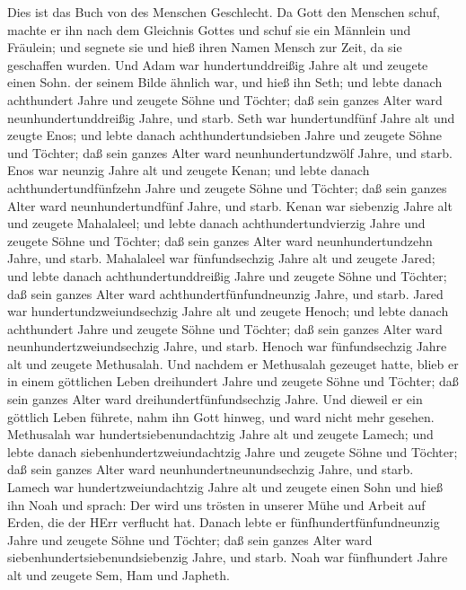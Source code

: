  Dies ist das Buch von des Menschen Geschlecht. Da Gott den
Menschen schuf, machte er ihn nach dem Gleichnis Gottes  und
schuf sie ein Männlein und Fräulein; und segnete sie und hieß ihren
Namen Mensch zur Zeit, da sie geschaffen wurden.  Und Adam
war hundertunddreißig Jahre alt und zeugete einen Sohn. der seinem Bilde
ähnlich war, und hieß ihn Seth;  und lebte danach
achthundert Jahre und zeugete Söhne und Töchter;  daß sein
ganzes Alter ward neunhundertunddreißig Jahre, und starb. 
Seth war hundertundfünf Jahre alt und zeugte Enos;  und
lebte danach achthundertundsieben Jahre und zeugete Söhne und Töchter;
 daß sein ganzes Alter ward neunhundertundzwölf Jahre, und
starb.  Enos war neunzig Jahre alt und zeugete Kenan;
 und lebte danach achthundertundfünfzehn Jahre und zeugete
Söhne und Töchter;  daß sein ganzes Alter ward
neunhundertundfünf Jahre, und starb.  Kenan war siebenzig
Jahre alt und zeugete Mahalaleel;  und lebte danach
achthundertundvierzig Jahre und zeugete Söhne und Töchter; 
daß sein ganzes Alter ward neunhundertundzehn Jahre, und starb.
 Mahalaleel war fünfundsechzig Jahre alt und zeugete Jared;
 und lebte danach achthundertunddreißig Jahre und zeugete
Söhne und Töchter;  daß sein ganzes Alter ward
achthundertfünfundneunzig Jahre, und starb.  Jared war
hundertundzweiundsechzig Jahre alt und zeugete Henoch;  und
lebte danach achthundert Jahre und zeugete Söhne und Töchter;
 daß sein ganzes Alter ward neunhundertzweiundsechzig
Jahre, und starb.  Henoch war fünfundsechzig Jahre alt und
zeugete Methusalah.  Und nachdem er Methusalah gezeuget
hatte, blieb er in einem göttlichen Leben dreihundert Jahre und zeugete
Söhne und Töchter;  daß sein ganzes Alter ward
dreihundertfünfundsechzig Jahre.  Und dieweil er ein
göttlich Leben führete, nahm ihn Gott hinweg, und ward nicht mehr
gesehen.  Methusalah war hundertsiebenundachtzig Jahre alt
und zeugete Lamech;  und lebte danach
siebenhundertzweiundachtzig Jahre und zeugete Söhne und Töchter;
 daß sein ganzes Alter ward neunhundertneunundsechzig
Jahre, und starb.  Lamech war hundertzweiundachtzig Jahre
alt und zeugete einen Sohn  und hieß ihn Noah und sprach:
Der wird uns trösten in unserer Mühe und Arbeit auf Erden, die der HErr
verflucht hat.  Danach lebte er fünfhundertfünfundneunzig
Jahre und zeugete Söhne und Töchter;  daß sein ganzes Alter
ward siebenhundertsiebenundsiebenzig Jahre, und starb. 
Noah war fünfhundert Jahre alt und zeugete Sem, Ham und Japheth.

